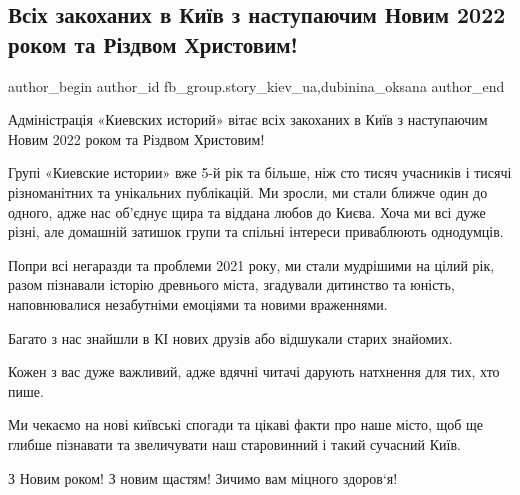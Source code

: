  
 
 
 
 
 
\subsection{Всіх закоханих в Київ з наступаючим Новим 2022 роком та Різдвом Христовим!}
\label{sec:30_12_2021.fb.fb_group.story_kiev_ua.2.pozdravlenie_novyj_god_rizdvo}
 
\ifcmt
 author_begin
   author_id fb_group.story_kiev_ua,dubinina_oksana
 author_end
\fi

Адміністрація «Киевских историй» вітає всіх закоханих в Київ з наступаючим
Новим 2022 роком та Різдвом Христовим!

Групі «Киевские истории» вже 5-й рік та більше, ніж сто тисяч учасників і
тисячі різноманітних та унікальних публікацій. Ми зросли, ми стали ближче один
до одного, адже нас об’єднує щира та віддана любов до Києва. Хоча ми всі дуже
різні, але домашній затишок групи та спільні інтереси приваблюють однодумців. 

Попри всі негаразди та проблеми 2021 року, ми стали мудрішими на цілий рік,
разом пізнавали історію древнього міста, згадували дитинство та юність,
наповнювалися незабутніми емоціями та новими враженнями. 

Багато з нас знайшли в КІ нових друзів або відшукали старих знайомих. 

Кожен з вас дуже важливий, адже вдячні читачі дарують натхнення для тих, хто
пише. 

Ми чекаємо на нові київські спогади та цікаві факти про наше місто, щоб ще
глибше пізнавати та звеличувати наш старовинний і такий сучасний Київ.

З Новим роком! З новим щастям! Зичимо вам міцного здоров‘я!

